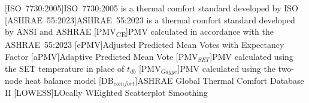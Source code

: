 \begin{acronym}[longest]
    [ISO~7730:2005]{ISO~7730:2005 is a thermal comfort standard developed by ISO}
    [ASHRAE~55:2023]{ASHRAE~55:2023 is a thermal comfort standard developed by ANSI and ASHRAE}
    [PMV\textsubscript{CE}]{PMV calculated in accordance with the ASHRAE~55:2023}
    [ePMV]{Adjusted Predicted Mean Votes with Expectancy Factor}
    [aPMV]{Adaptive Predicted Mean Vote}
    [PMV$_{SET}$]{PMV calculated using the SET temperature in place of $t_{db}$}
    [PMV$_{Gagge}$]{PMV calculated using the two-node heat balance model}
    [DB$_{comfort}$]{ASHRAE Global Thermal Comfort Database II}
    [LOWESS]{LOcally WEighted Scatterplot Smoothing}

\end{acronym}
\renewcommand{\baselinestretch}{1}\normalsize
